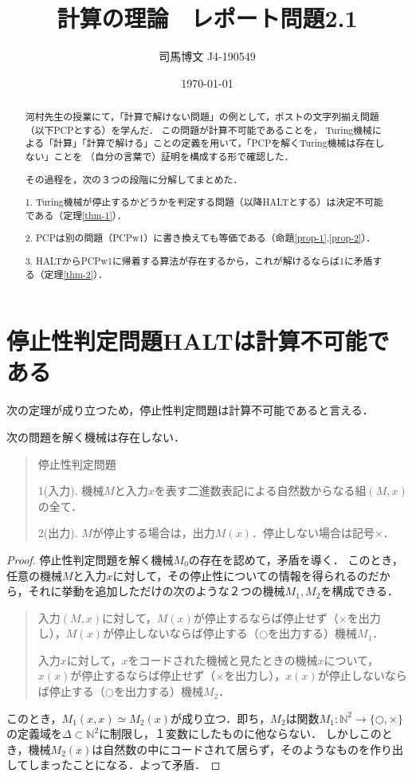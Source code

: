 \documentclass[uplatex, dvipdfmx]{jsarticle}
\title{計算の理論　レポート問題2.1}
\author{司馬博文 J4-190549}
\date{\today}
\begin{document}
\maketitle
\begin{abstract}
    河村先生の授業にて，「計算で解けない問題」の例として，ポストの文字列揃え問題（以下PCPとする）を学んだ．
    この問題が計算不可能であることを，
    Turing機械による「計算」「計算で解ける」ことの定義を用いて，「PCPを解くTuring機械は存在しない」ことを
    （自分の言葉で）証明を構成する形で確認した．
    
    その過程を，次の３つの段階に分解してまとめた．

    1. Turing機械が停止するかどうかを判定する問題（以降HALTとする）は決定不可能である（定理\ref{thm-1}）．

    2. PCPは別の問題（PCPw1）に書き換えても等価である（命題\ref{prop-1},\ref{prop-2}）．

    3. HALTからPCPw1に帰着する算法が存在するから，これが解けるならば1に矛盾する（定理\ref{thm-2}）．
\end{abstract}

\section{停止性判定問題HALTは計算不可能である}

次の定理が成り立つため，停止性判定問題は計算不可能であると言える．

\begin{theorem}[停止性判定機械の非存在]\label{thm-1}
    次の問題を解く機械は存在しない．
    \begin{quotation}停止性判定問題

        1(入力). 機械$M$と入力$x$を表す二進数表記による自然数からなる組$(M,x)$の全て．

        2(出力). $M$が停止する場合は，出力$M(x)$．停止しない場合は記号$\times$．
    \end{quotation}
\end{theorem}
\begin{proof}
    停止性判定問題を解く機械$M_0$の存在を認めて，矛盾を導く．
    このとき，任意の機械$M$と入力$x$に対して，その停止性についての情報を得られるのだから，それに挙動を追加しただけの次のような２つの機械$M_1,M_2$を構成できる．

    \begin{quotation}
        入力$(M,x)$に対して，$M(x)$が停止するならば停止せず（$\times$を出力し），$M(x)$が停止しないならば停止する（$\bigcirc$を出力する）機械$M_1$．

        入力$x$に対して，$x$をコードされた機械と見たときの機械$x$について，$x(x)$が停止するならば停止せず（$\times$を出力し），$x(x)$が停止しないならば停止する（$\bigcirc$を出力する）機械$M_2$．
    \end{quotation}

    このとき，$M_1(x,x)\simeq M_2(x)$が成り立つ．即ち，$M_2$は関数$M_1:\mathbb{N}^2\to\{\bigcirc,\times\}$の定義域を$\Delta\subset\mathbb{N}^2$に制限し，１変数にしたものに他ならない．
    しかしこのとき，機械$M_2(x)$は自然数の中にコードされて居らず，そのようなものを作り出してしまったことになる．よって矛盾．
\end{proof}
\end{document}
